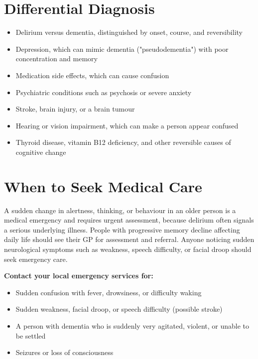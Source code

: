 \section*{Differential Diagnosis}
\begin{itemize}
    \item Delirium versus dementia, distinguished by onset, course, and reversibility
    \item Depression, which can mimic dementia ("pseudodementia") with poor concentration and memory
    \item Medication side effects, which can cause confusion
    \item Psychiatric conditions such as psychosis or severe anxiety
    \item Stroke, brain injury, or a brain tumour
    \item Hearing or vision impairment, which can make a person appear confused
    \item Thyroid disease, vitamin B12 deficiency, and other reversible causes of cognitive change
\end{itemize}

\section*{When to Seek Medical Care}
A sudden change in alertness, thinking, or behaviour in an older person is a medical emergency and requires urgent assessment, because delirium often signals a serious underlying illness. People with progressive memory decline affecting daily life should see their GP for assessment and referral. Anyone noticing sudden neurological symptoms such as weakness, speech difficulty, or facial droop should seek emergency care.

\textbf{Contact your local emergency services for:}
\begin{itemize}
    \item Sudden confusion with fever, drowsiness, or difficulty waking
    \item Sudden weakness, facial droop, or speech difficulty (possible stroke)
    \item A person with dementia who is suddenly very agitated, violent, or unable to be settled
    \item Seizures or loss of consciousness
\end{itemize}


